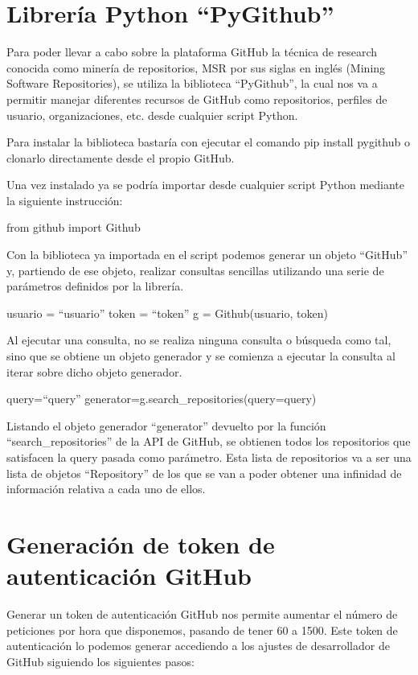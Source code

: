 \section{Librería Python ``PyGithub''}

Para poder llevar a cabo sobre la plataforma GitHub la técnica de research conocida como minería de repositorios, MSR por sus siglas en inglés (Mining Software Repositories), se utiliza la biblioteca ``PyGithub'', la cual nos va a permitir manejar diferentes recursos de GitHub como repositorios, perfiles de usuario, organizaciones, etc. desde cualquier script Python.

Para instalar la biblioteca bastaría con ejecutar el comando pip install pygithub o clonarlo directamente desde el propio GitHub.

Una vez instalado ya se podría importar desde cualquier script Python mediante la siguiente instrucción:

from github import Github

Con la biblioteca ya importada en el script podemos generar un objeto ``GitHub'' y, partiendo de ese objeto, realizar consultas sencillas utilizando una serie de parámetros definidos por la librería.

usuario = ``\<usuario\>'' 
token = ``\<token\>''
g = Github(usuario, token)

Al ejecutar una consulta, no se realiza ninguna consulta o búsqueda como tal, sino que se obtiene un objeto generador y se comienza a ejecutar la consulta al iterar sobre dicho objeto generador.

query=``\<query\>'' 
generator=g.search\_repositories(query=query)

Listando el objeto generador “generator” devuelto por la función ``search\_repositories'' de la API de GitHub, se obtienen todos los repositorios que satisfacen la query pasada como parámetro. Esta lista de repositorios va a ser una lista de objetos “Repository” de los que se van a poder obtener una infinidad de información relativa a cada uno de ellos.

\section{Generación de token de autenticación GitHub}

Generar un token de autenticación GitHub nos permite aumentar el número de peticiones por hora que disponemos, pasando de tener 60 a 1500.
Este token de autenticación lo podemos generar accediendo a los ajustes de desarrollador de GitHub siguiendo los siguientes pasos:

